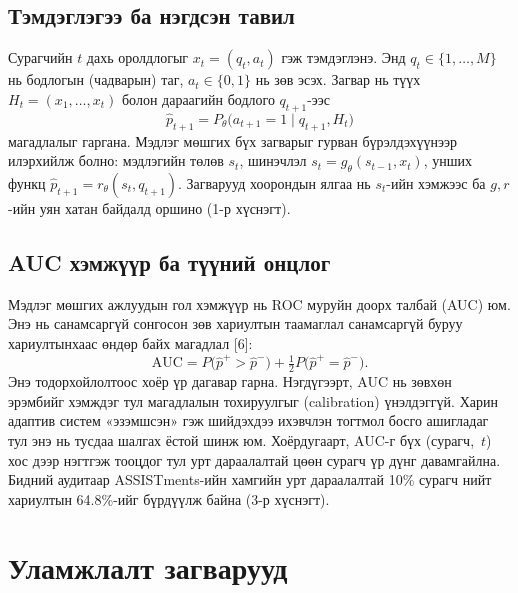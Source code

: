 \documentclass[10pt,twocolumn]{article}
\begin{document}
\subsection{Тэмдэглэгээ ба нэгдсэн тавил}
Сурагчийн $t$ дахь оролдлогыг $x_t=(q_t,a_t)$ гэж тэмдэглэнэ. Энд $q_t\in\{1,\dots,M\}$ нь
бодлогын (чадварын) таг, $a_t\in\{0,1\}$ нь зөв эсэх. Загвар нь түүх
$H_t=(x_1,\dots,x_t)$ болон дараагийн бодлого $q_{t+1}$-ээс
\begin{equation}
\hat p_{t+1}=P_\theta\bigl(a_{t+1}=1\mid q_{t+1},H_t\bigr)
\end{equation}
магадлалыг гаргана. Мэдлэг мөшгих бүх загварыг гурван бүрэлдэхүүнээр илэрхийлж болно: мэдлэгийн
төлөв $s_t$, шинэчлэл $s_t=g_\theta(s_{t-1},x_t)$, унших функц
$\hat p_{t+1}=r_\theta(s_t,q_{t+1})$. Загварууд хоорондын ялгаа нь $s_t$-ийн хэмжээс ба
$g,r$-ийн уян хатан байдалд оршино (1-р хүснэгт).

\subsection{AUC хэмжүүр ба түүний онцлог}
Мэдлэг мөшгих ажлуудын гол хэмжүүр нь ROC муруйн доорх талбай (AUC) юм. Энэ нь санамсаргүй
сонгосон зөв хариултын таамаглал санамсаргүй буруу хариултынхаас өндөр байх магадлал [6]:
\begin{equation}
\mathrm{AUC}=P\bigl(\hat p^{+}>\hat p^{-}\bigr)+\tfrac12 P\bigl(\hat p^{+}=\hat p^{-}\bigr).
\end{equation}
Энэ тодорхойлолтоос хоёр үр дагавар гарна. Нэгдүгээрт, AUC нь зөвхөн эрэмбийг хэмждэг тул
магадлалын тохируулгыг (calibration) үнэлдэггүй. Харин адаптив систем «эзэмшсэн» гэж шийдэхдээ
ихэвчлэн тогтмол босго ашигладаг тул энэ нь тусдаа шалгах ёстой шинж юм. Хоёрдугаарт, AUC-г
бүх (сурагч,~$t$) хос дээр нэгтгэж тооцдог тул урт дараалалтай цөөн сурагч үр дүнг давамгайлна.
Бидний аудитаар ASSISTments-ийн хамгийн урт дараалалтай 10\% сурагч нийт хариултын 64.8\%-ийг
бүрдүүлж байна (3-р хүснэгт).

\section{Уламжлалт загварууд}
\end{document}
